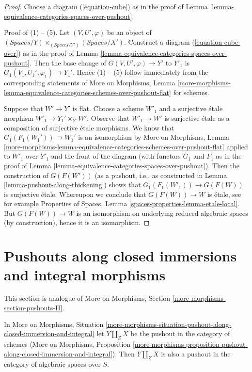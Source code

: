 \begin{proof}
Choose a diagram (\ref{equation-cube}) as in the proof of
Lemma \ref{lemma-equivalence-categories-spaces-over-pushout}.

\medskip\noindent
Proof of (1) -- (5). Let $(V, U', \varphi)$ be an object of
$(\textit{Spaces}/Y) \times_{(\textit{Spaces}/Y')} (\textit{Spaces}/X')$.
Construct a diagram (\ref{equation-cube-over}) as in the proof of
Lemma \ref{lemma-equivalence-categories-spaces-over-pushout}.
Then the base change of $G(V, U', \varphi) \to Y'$ to
$Y'_1$ is $G_1(V_1, U_1', \varphi_1) \to Y_1'$. Hence (1) -- (5)
follow immediately from the corresponding statements of
More on Morphisms, Lemma
\ref{more-morphisms-lemma-equivalence-categories-schemes-over-pushout-flat}
for schemes.

\medskip\noindent
Suppose that $W' \to Y'$ is flat. Choose a scheme $W'_1$ and a surjective
\'etale morphism $W'_1 \to Y_1' \times_{Y'} W'$. Observe that $W'_1 \to W'$
is surjective \'etale as a composition of surjective \'etale morphisms. We
know that $G_1(F_1(W_1')) \to W_1'$ is an isomorphism by
More on Morphisms, Lemma
\ref{more-morphisms-lemma-equivalence-categories-schemes-over-pushout-flat}
applied to $W'_1$ over $Y'_1$ and the front of the diagram (with functors
$G_1$ and $F_1$ as in the proof of
Lemma \ref{lemma-equivalence-categories-spaces-over-pushout}).
Then the construction of $G(F(W'))$ (as a pushout, i.e.,
as constructed in Lemma \ref{lemma-pushout-along-thickening}) shows that
$G_1(F_1(W'_1)) \to G(F(W))$ is surjective \'etale. Whereupon we conclude
that $G(F(W)) \to W$ is \'etale, see for example
Properties of Spaces, Lemma \ref{spaces-properties-lemma-etale-local}.
But $G(F(W)) \to W$ is an isomorphism on underlying reduced
algebraic spaces (by construction), hence it is an isomorphism.
\end{proof}







\section{Pushouts along closed immersions and integral morphisms}
\label{section-pushouts-II}

\noindent
This section is analogue of
More on Morphisms, Section \ref{more-morphisms-section-pushouts-II}.

\begin{lemma}
\label{lemma-pushout-along-closed-immersion-and-integral}
In More on Morphisms, Situation
\ref{more-morphisms-situation-pushout-along-closed-immersion-and-integral}
let $Y \amalg_Z X$ be the pushout in the category of schemes
(More on Morphisms, Proposition
\ref{more-morphisms-proposition-pushout-along-closed-immersion-and-integral}).
Then $Y \amalg_Z X$
is also a pushout in the category of algebraic spaces over $S$.
\end{lemma}

